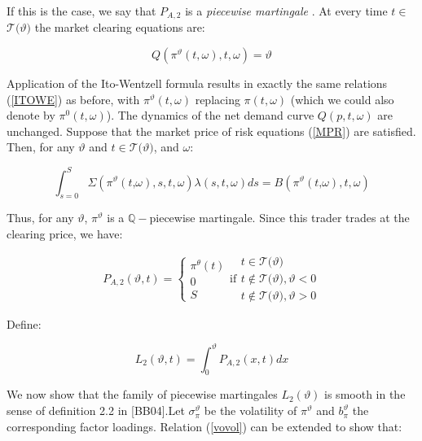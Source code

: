\documentclass{article}
\begin{document}
If this is the case, we say that $P_{A,2}$ is a \textit{piecewise martingale}%
. At every time $t\in $ $\mathcal{T(}\vartheta )$ the market clearing
equations are:

\begin{equation*}
Q(\pi ^{\vartheta }(t,\omega ),t,\omega )=\vartheta
\end{equation*}

Application of the Ito-Wentzell formula results in exactly the same
relations (\ref{ITOWE}) as before, with $\pi ^{\vartheta }(t,\omega )$
replacing $\pi (t,\omega )$ (which we could also denote by $\pi
^{0}(t,\omega )$). The dynamics of the net demand curve $Q(p,t,\omega )$ are
unchanged. Suppose that the market price of risk equations (\ref{MPR}) are
satisfied. Then, for any $\vartheta $ and $t\in \mathcal{T(}\vartheta )$,
and $\omega $:

\begin{equation*}
\int_{s=0}^{S}\Sigma (\pi ^{\vartheta }(t\text{,}\omega ),s,t,\omega
)\lambda (s,t,\omega )ds=B(\pi ^{\vartheta }(t\text{,}\omega ),t,\omega )
\end{equation*}

Thus, for any $\vartheta $, $\pi ^{\vartheta }$ is a $\mathbb{Q}-$piecewise
martingale. Since this trader trades at the clearing price, we have:

\begin{equation*}
P_{A,2}(\vartheta ,t)=\left\{ 
\begin{array}{c}
\pi ^{\theta }(t) \\ 
0 \\ 
S%
\end{array}%
\right. \text{if}%
\begin{array}{c}
t\in \mathcal{T(}\vartheta ) \\ 
t\notin \mathcal{T(}\vartheta ),\vartheta <0 \\ 
t\notin \mathcal{T(}\vartheta ),\vartheta >0%
\end{array}%
\end{equation*}

Define:

\begin{equation*}
L_{2}(\vartheta ,t)=\int_{0}^{\vartheta }P_{A,2}(x,t)dx
\end{equation*}

We now show that the family of piecewise martingales $L_{2}(\vartheta )$ is
smooth in the sense of definition 2.2 in [BB04]$.$Let $\sigma _{\pi
}^{\vartheta }$ be the volatility of $\pi ^{\vartheta }$ and $b_{\pi
}^{\vartheta }$ the corresponding factor loadings. Relation (\ref{vovol})
can be extended to show that:
\end{document}
